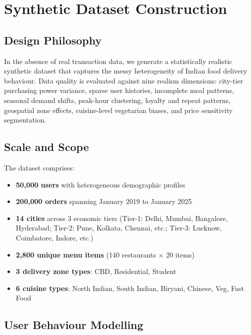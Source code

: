 \documentclass[conference]{IEEEtran}
\begin{document}
\section{Synthetic Dataset Construction}

\subsection{Design Philosophy}

In the absence of real transaction data, we generate a statistically realistic
synthetic dataset that captures the messy heterogeneity of Indian food delivery
behaviour. Data quality is evaluated against nine realism dimensions:
city-tier purchasing power variance, sparse user histories, incomplete meal
patterns, seasonal demand shifts, peak-hour clustering, loyalty and repeat
patterns, geospatial zone effects, cuisine-level vegetarian biases, and
price sensitivity segmentation.

\subsection{Scale and Scope}

The dataset comprises:
\begin{itemize}
  \item \textbf{50,000 users} with heterogeneous demographic profiles
  \item \textbf{200,000 orders} spanning January 2019 to January 2025
  \item \textbf{14 cities} across 3 economic tiers (Tier-1: Delhi, Mumbai,
        Bangalore, Hyderabad; Tier-2: Pune, Kolkata, Chennai, etc.;
        Tier-3: Lucknow, Coimbatore, Indore, etc.)
  \item \textbf{2,800 unique menu items} (140 restaurants $\times$ 20 items)
  \item \textbf{3 delivery zone types}: CBD, Residential, Student
  \item \textbf{6 cuisine types}: North Indian, South Indian, Biryani, Chinese,
        Veg, Fast Food
\end{itemize}

\subsection{User Behaviour Modelling}
\end{document}
